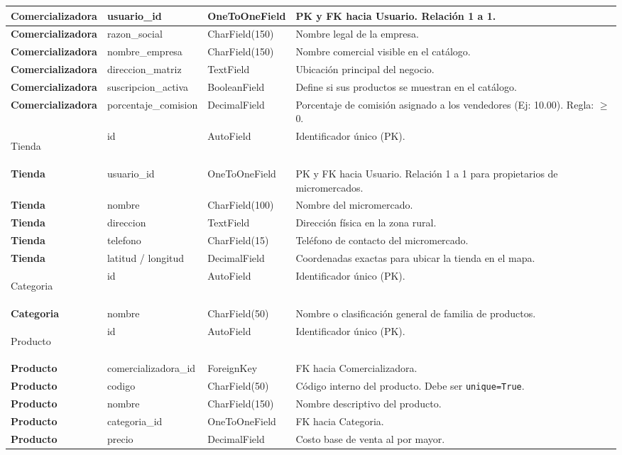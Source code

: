 \documentclass{article}
\begin{document}
\begin{longtable}{|>{\bfseries}p{3.2cm}|p{3.5cm}|p{2.8cm}|p{5.5cm}|}
Comerciali\-zadora & usuario\_id & OneToOneField & PK y FK hacia Usuario. Relación 1 a 1. \\ \hline
Comerciali\-zadora & razon\_social & CharField(150) & Nombre legal de la empresa. \\ \hline
Comerciali\-zadora & nombre\_empresa & CharField(150) & Nombre comercial visible en el catálogo. \\ \hline
Comerciali\-zadora & direccion\_matriz & TextField & Ubicación principal del negocio. \\ \hline
Comerciali\-zadora & suscripcion\_activa & BooleanField & Define si sus productos se muestran en el catálogo. \\ \hline
Comerciali\-zadora & porcentaje\_comision & DecimalField & Porcentaje de comisión asignado a los vendedores (Ej: 10.00). Regla: $\ge$ 0. \\ \hline

Tienda & id & AutoField & Identificador único (PK). \\ \hline
Tienda & usuario\_id & OneToOneField & PK y FK hacia Usuario. Relación 1 a 1 para propietarios de micromercados. \\ \hline
Tienda & nombre & CharField(100) & Nombre del micromercado. \\ \hline
Tienda & direccion & TextField & Dirección física en la zona rural. \\ \hline
Tienda & telefono & CharField(15) & Teléfono de contacto del micromercado. \\ \hline
Tienda & latitud / longitud & DecimalField & Coordenadas exactas para ubicar la tienda en el mapa. \\ \hline

Categoria & id & AutoField & Identificador único (PK). \\ \hline
Categoria & nombre & CharField(50) & Nombre o clasificación general de familia de productos. \\ \hline

Producto & id & AutoField & Identificador único (PK). \\ \hline
Producto & comercializadora\_id & ForeignKey & FK hacia Comercializadora. \\ \hline
Producto & codigo & CharField(50) & Código interno del producto. Debe ser \texttt{unique=True}. \\ \hline
Producto & nombre & CharField(150) & Nombre descriptivo del producto. \\ \hline
Producto & categoria\_id & OneToOneField & FK hacia Categoria. \\ \hline
Producto & precio & DecimalField & Costo base de venta al por mayor. \\ \hline


\end{longtable}
\end{document}
